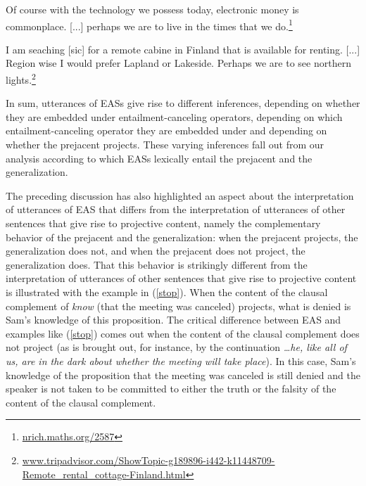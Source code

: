 \documentclass[11pt,fleqn]{article}
\newcommand{\6}{\mbox{$[\hspace*{-.6mm}[$}}
\newcommand{\9}{\mbox{$]\hspace*{-.6mm}]$}}
\begin{document}
\begin{exe}
\ex\label{perhaps}

\begin{xlist}

\ex Of course with the technology we possess today, electronic money is commonplace. [...] perhaps we are  to live in the times that we do.\footnote{\url{nrich.maths.org/2587}}

\ex I am seaching [sic] for a remote cabine in Finland that is available for renting. [...]
Region wise I would prefer Lapland or Lakeside. Perhaps we are  to see northern lights.\footnote{\url{www.tripadvisor.com/ShowTopic-g189896-i442-k11448709-Remote_rental_cottage-Finland.html}}

\end{xlist}

\end{exe}
In sum, utterances of EASs give rise to different inferences, depending on whether they are embedded under entailment-canceling operators, depending on which entailment-canceling operator they are embedded under and depending on whether the prejacent projects. These varying inferences fall out from our analysis according to which EASs lexically entail the prejacent and the generalization. 

The preceding discussion has also highlighted an aspect about the interpretation of utterances of EAS that differs from the interpretation of utterances of other sentences that give rise to projective content, namely the complementary behavior of the prejacent and the generalization: when the prejacent projects, the generalization does not, and when the prejacent does not project, the generalization does. That this behavior is strikingly different from the interpretation of utterances of other sentences that give rise to projective content is illustrated with the example in (\ref{stop}). When the content of the clausal complement of {\em know} (that the meeting was canceled) projects, what is denied is Sam's knowledge of this proposition. The critical difference between EAS and examples like (\ref{stop}) comes out when the content of the clausal complement does not project (as is brought out, for instance, by the continuation {\em \ldots he, like all of us, are in the dark about whether the meeting will take place}). In this case, Sam's knowledge of the proposition that the meeting was canceled is still denied and the speaker is not taken to be committed to either the truth or the falsity of the content of the clausal complement. 
\end{document}
